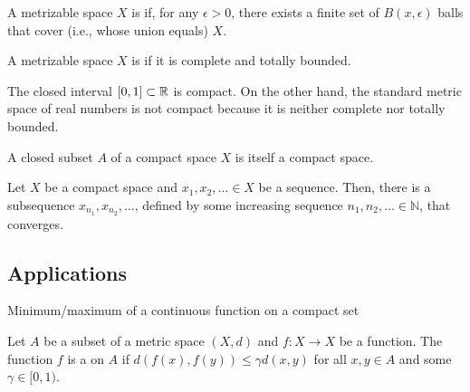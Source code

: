 \begin{definition}
A metrizable space $X$ is  if, for any $\epsilon > 0$, there exists a finite set of $B(x,\epsilon)$ balls that cover (i.e., whose union equals) $X$.
\end{definition}

\begin{definition}
A metrizable space $X$ is  if it is complete and totally bounded.
\end{definition}

\begin{example}
The closed interval $[0,1]\subset \mathbb{R}$ is compact.
On the other hand, the standard metric space of real numbers is not compact because it is neither complete nor totally bounded.
\end{example}

\begin{theorem}
A closed subset $A$ of a compact space $X$ is itself a compact space.
\end{theorem}

\begin{theorem}
Let $X$ be a compact space and $x_1,x_2,\ldots \in X$ be a sequence.
Then, there is a subsequence $x_{n_1},x_{n_2},\ldots$, defined by some increasing sequence $n_1,n_2,\ldots \in \mathbb{N}$, that converges.
\end{theorem}


\subsection{Applications}

Minimum/maximum of a continuous function on a compact set

\begin{definition}
Let $A$ be a subset of a metric space $(X,d)$ and $f: X \rightarrow X$ be a function.
The function $f$ is a  on $A$ if $d \left( f(x),f(y) \right) \leq \gamma  d(x,y)$ for all $x,y\in A$ and some $\gamma \in [0,1)$.
\end{definition}


